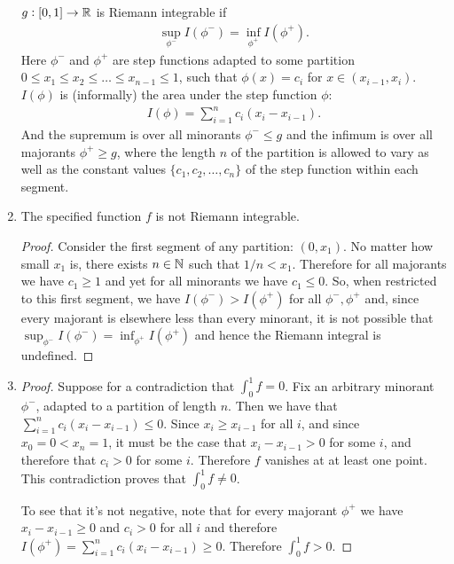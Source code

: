 \begin{enumerate}
  \begin{definition}
    $g: [0, 1] \to \mathbb{R}$ is Riemann integrable if
    \begin{align*}
      \sup_{\phi^-} I(\phi^-) = \inf_{\phi^+} I(\phi^+).
    \end{align*}
    Here $\phi^-$ and $\phi^+$ are step functions adapted​ to some
    partition $0 \leq x_1 \leq x_2 \leq \ldots \leq x_{n-1} \leq 1$, such that $\phi(x) = c_i$
    for $x \in (x_{i-1}, x_i)$. $I(\phi)$ is (informally) the area under the step function $\phi$:
    \begin{align*}
      I(\phi) = \sum_{i=1}^n c_i(x_i - x_{i-1}).
    \end{align*}
    And the supremum is over all minorants $\phi^- \leq g$ and the infimum is over all
    majorants $\phi^+ \geq g$, where the length $n$ of the partition is allowed to vary as well as the constant
    values $\{c_1, c_2, \ldots, c_n\}$ of the step function within each segment.
  \end{definition}
\item
  \begin{claim}
    The specified function $f$ is not Riemann integrable.
  \end{claim}

  \begin{proof}
    Consider the first segment of any partition: $(0, x_1)$. No matter how small $x_1$ is, there
    exists $n \in \mathbb{N}$ such that $1/n < x_1$. Therefore for all majorants we have $c_1 \geq 1$ and yet for all
    minorants we have $c_1 \leq 0$. So, when restricted to this first segment, we have $I(\phi^-) > I(\phi^+)$
    for all $\phi^-, \phi^+$ and, since every majorant is elsewhere less than every minorant, it is not
    possible that $\sup_{\phi^-} I(\phi^-) = \inf_{\phi^+} I(\phi^+)$ and hence the Riemann integral is
    undefined.
  \end{proof}

\item
  \begin{proof}
    Suppose for a contradiction that $\int_0^1 f = 0$. Fix an arbitrary minorant $\phi^-$, adapted to a
    partition of length $n$. Then we have that $\sum_{i=1}^n c_i(x_i - x_{i-1}) \leq 0$.
    Since $x_i \geq x_{i-1}$ for all $i$, and since $x_0 = 0 < x_n = 1$, it must be the case
    that $x_i - x_{i-1} > 0$ for some $i$, and therefore that $c_i > 0$ for some $i$. Therefore $f$ vanishes at
    at least one point. This contradiction proves that $\int_0^1 f \neq 0$.

    To see that it's not negative, note that for every majorant $\phi^+$ we have $x_i - x_{i-1} \geq 0$
    and $c_i > 0$ for all $i$ and therefore $I(\phi^+) = \sum_{i=1}^n c_i(x_i - x_{i-1}) \geq 0$. Therefore $\int_0^1 f > 0$.
  \end{proof}

\end{enumerate}

